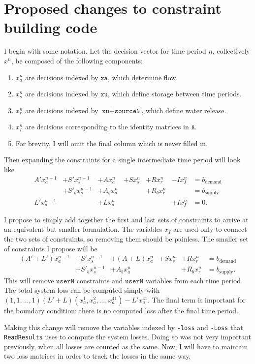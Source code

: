 \documentclass[11pt]{article}
\newcommand{\A}{\texttt{A}}
\newcommand{\xa}{\texttt{xa}}
\newcommand{\xu}{\texttt{xu}}
\newcommand{\sourceN}{\texttt{sourceN}}
\newcommand{\userN}{\texttt{userN}}
\begin{document}
\section*{Proposed changes to constraint building code}

I begin with some notation.
Let the decision vector for time period $n$, collectively $x^n$, be composed of the following components:
\begin{enumerate}
	\item $x^n_a$ are decisions indexed by $\xa$, which determine flow.
	\item $x^n_s$ are decisions indexed by $\xu$, which define storage between time periods.
	\item $x^n_r$ are decisions indexed by $\xu+\sourceN$, which define water release.
	\item $x^n_I$ are decisions corresponding to the identity matrices in $\A$.
	\item For brevity, I will omit the final column which is never filled in.
\end{enumerate}

Then expanding the constraints for a single intermediate time period will look like
\[
	\begin{array}{rrrrrrl}
		A' x^{n-1}_a & + S' x^{n-1}_s   & + A x^n_a   & + S x^n_s & + R x^n_r   & - Ix^n_I  & = b_\text{demand} \\
		             & + S'_b x^{n-1}_s & + A_b x^n_a &           & + R_b x^n_r &           & = b_\text{supply} \\
		L' x^{n-1}_a &                  & + L x^n_a   &           &             & + I x^n_I & = 0.
	\end{array}
\]

I propose to simply add together the first and last sets of constraints to arrive at an equivalent but smaller formulation.
The variables $x_I$ are used only to connect the two sets of constraints, so removing them should be painless.
The smaller set of constraints I propose will be
\[
	\begin{array}{rrrrrl}
		(A'+L') x^{n-1}_a & + S' x^{n-1}_s   & + (A+L) x^n_a   & + S x^n_s & + R x^n_r   & = b_\text{demand} \\
		                  & + S'_b x^{n-1}_s & + A_b x^n_a     &           & + R_b x^n_r & = b_\text{supply}.
	\end{array}
\]
This will remove $\userN$ constraints and $\userN$ variables from each time period.
The total system loss can be computed simply with $(1, 1, \dots, 1) (L'+L) (x^1_a, x^2_a, \dots, x^{41}_a) - L' x^{41}_a$.
The final term is important for the boundary condition: there is no computed loss after the final time period.

Making this change will remove the variables indexed by \texttt{-loss} and \texttt{-Loss} that \texttt{ReadResults} uses to compute the system losses.
Doing so was not very important previously, when all losses are counted as the same.
Now, I will have to maintain two loss matrices in order to track the losses in the same way.
\end{document}
